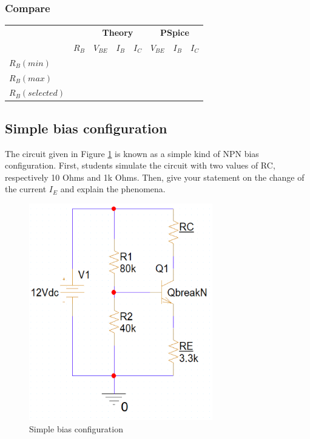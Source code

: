 \subsubsection{Compare}
\begin{center}
    \begin{tabular}{l|l|l|l|l|l|l|l|}
    \cline{2-8}
                                     & & \multicolumn{3}{c|}{\textbf{Theory}} & \multicolumn{3}{c|}{\textbf{PSpice}} \\ \cline{2-8} 
                                     &$R_B$ & $V_{BE}$              & $I_B$              & $I_C$              & $V_{BE}$              & $I_B$              & $I_C$             \\ \hline
     \multicolumn{1}{|l|}{$R_B(min)$} &      &          &                &                &                &                &               \\ \hline
    \multicolumn{1}{|l|}{$R_B(max)$}  &        &        &                &                &                &                &               \\ \hline
        \multicolumn{1}{|l|}{$R_B(selected)$}  &       &         &                &                &                &                &               \\ \hline

    \end{tabular}
\end{center}


\subsection{Simple bias configuration}
The circuit given in Figure \ref{lab3_ex5_de} is known as a simple kind of NPN bias configuration. First, students simulate the circuit with two values of RC, respectively 10 Ohms and 1k Ohms. Then, give your statement on the change of the current $I_E$ and explain the phenomena.

\begin{figure}[H]
    \centering
    \includegraphics[width=8cm]{source/picture/bai_3/lab3_ex5_de.png}
    \caption{Simple bias configuration}
    \label{lab3_ex5_de}
\end{figure}

